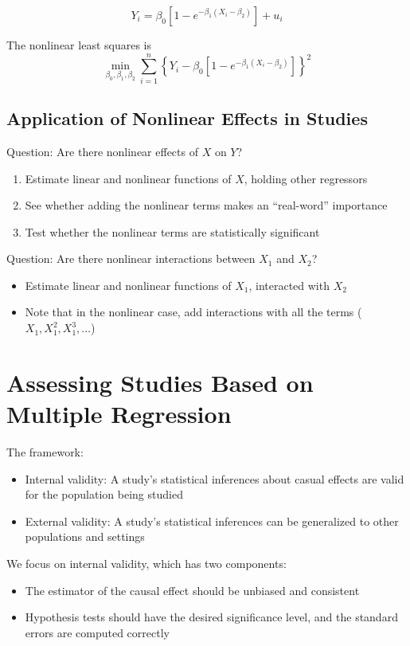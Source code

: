 \documentclass{article}
\newcommand{\sumlimits}{\sum \limits _{i=1}^{n}}
\begin{document}
\[
	Y_i = \beta_0 \left[ 1-e^{-\beta_1 (X_i - \beta_2)} \right] + u_i
\]

The nonlinear least squares is
\[
	\min _{\beta_0, \beta_1, \beta_2} \sumlimits \left\{
		Y_i - \beta_0 \left[
			1 - e^{-\beta_1 (X_i - \beta_2)}
		\right]
	\right\}^2
\]

\subsection{Application of Nonlinear Effects in Studies}

Question: Are there nonlinear effects of $X$ on $Y$?
\begin{enumerate}
	\item Estimate linear and nonlinear functions of $X$, holding other regressors
	\item See whether adding the nonlinear terms makes an ``real-word'' importance
	\item Test whether the nonlinear terms are statistically significant
\end{enumerate}

Question: Are there nonlinear interactions between $X_1$ and $X_2$?
\begin{itemize}
	\item Estimate linear and nonlinear functions of $X_1$, interacted with $X_2$
	\item Note that in the nonlinear case, add interactions with all the terms ($X_1, X_1^2, X_1^3, \ldots$)
\end{itemize}



\section{Assessing Studies Based on Multiple Regression}

The framework:
\begin{itemize}
	\item Internal validity: A study's statistical inferences about casual effects
					are valid for the population being studied
	\item External validity: A study's statistical inferences can be generalized to other populations and settings
\end{itemize}

We focus on internal validity, which has two components:
\begin{itemize}
	\item The estimator of the causal effect should be unbiased and consistent
	\item Hypothesis tests should have the desired significance level,
					and the standard errors are computed correctly
\end{itemize}
\end{document}
